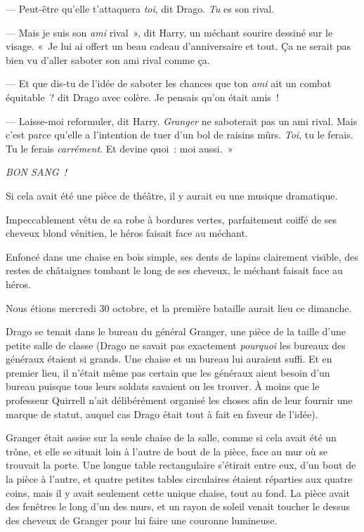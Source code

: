 --- Peut-être qu'elle t'attaquera \emph{toi}, dit Drago.
\emph{Tu} es son rival.

--- Mais je suis son \emph{ami} rival~», dit Harry, un méchant sourire dessiné sur le visage.
«~Je lui ai offert un beau cadeau d'anniversaire et tout.
Ça ne serait pas bien vu d'aller saboter son ami rival comme ça.

--- Et que dis-tu de l'idée de saboter les chances que ton \emph{ami} ait un combat équitable~? dit Drago avec colère.
Je pensais qu'on était amis~!

--- Laisse-moi reformuler, dit Harry.
\emph{Granger} ne saboterait pas un ami rival.
Mais c'est parce qu'elle a l'intention de tuer d'un bol de raisins mûrs.
\emph{Toi}, tu le ferais.
Tu le ferais \emph{carrément}.
Et devine quoi~: moi aussi.~»

\emph{BON SANG~!}

\later

Si cela avait été une pièce de théâtre, il y aurait eu une musique dramatique.

Impeccablement vêtu de sa robe à bordures vertes, parfaitement coiffé de ses cheveux blond vénitien, le héros faisait face au méchant.

Enfoncé dans une chaise en bois simple, ses dents de lapins clairement visible, des restes de châtaignes tombant le long de ses cheveux, le méchant faisait face au héros.

Nous étions mercredi 30 octobre, et la première bataille aurait lieu ce dimanche.

Drago se tenait dans le bureau du général Granger, une pièce de la taille d'une petite salle de classe (Drago ne savait pas exactement \emph{pourquoi} les bureaux des généraux étaient si grands.
Une chaise et un bureau lui auraient suffi.
Et en premier lieu, il n'était même pas certain que les généraux aient besoin d'un bureau puisque tous leurs soldats savaient ou les trouver.
À moins que le professeur Quirrell n'ait délibérément organisé les choses afin de leur fournir une marque de statut, auquel cas Drago était tout à fait en faveur de l'idée).

Granger était assise sur la seule chaise de la salle, comme si cela avait été un trône, et elle se situait loin à l'autre de bout de la pièce, face au mur où se trouvait la porte.
Une longue table rectangulaire s'étirait entre eux, d'un bout de la pièce à l'autre, et quatre petites tables circulaires étaient réparties aux quatre coins, mais il y avait seulement cette unique chaise, tout au fond.
La pièce avait des fenêtres le long d'un des murs, et un rayon de soleil venait toucher le dessus des cheveux de Granger pour lui faire une couronne lumineuse.

